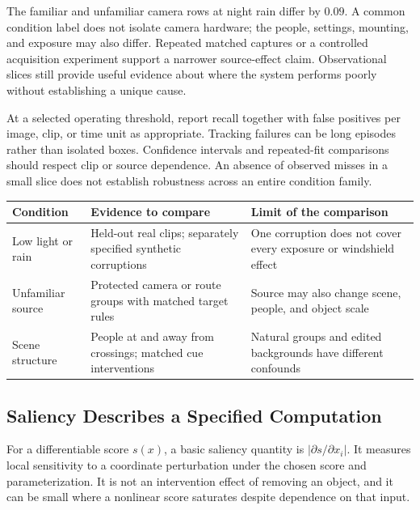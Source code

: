 The familiar and unfamiliar camera rows at night rain differ by $0.09$. A common condition label does not isolate camera hardware; the people, settings, mounting, and exposure may also differ. Repeated matched captures or a controlled acquisition experiment support a narrower source-effect claim. Observational slices still provide useful evidence about where the system performs poorly without establishing a unique cause.

At a selected operating threshold, report recall together with false positives per image, clip, or time unit as appropriate. Tracking failures can be long episodes rather than isolated boxes. Confidence intervals and repeated-fit comparisons should respect clip or source dependence. An absence of observed misses in a small slice does not establish robustness across an entire condition family.

\par\addvspace{\intextsep}\noindent\begin{minipage}{\linewidth}
\centering\small
\begin{tabular}{@{}L{2.3cm}L{3.4cm}L{4.0cm}@{}}
\toprule
Condition & Evidence to compare & Limit of the comparison \\
\midrule
Low light or rain & Held-out real clips; separately specified synthetic corruptions & One corruption does not cover every exposure or windshield effect \\
Unfamiliar source & Protected camera or route groups with matched target rules & Source may also change scene, people, and object scale \\
Scene structure & People at and away from crossings; matched cue interventions & Natural groups and edited backgrounds have different confounds \\
\bottomrule
\end{tabular}
\label{tab:robustness-stress-test}
\end{minipage}\par\addvspace{\intextsep}

\subsection{Saliency Describes a Specified Computation}

For a differentiable score $s(x)$, a basic saliency quantity is $|\partial s/\partial x_i|$. It measures local sensitivity to a coordinate perturbation under the chosen score and parameterization. It is not an intervention effect of removing an object, and it can be small where a nonlinear score saturates despite dependence on that input.

